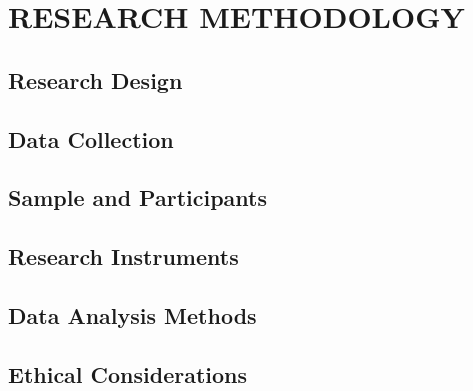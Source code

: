 
\chapter{RESEARCH METHODOLOGY}\label{chap:methodology}


\section{Research Design}\label{sec:design}

\section{Data Collection}\label{sec:data_collection}

\section{Sample and Participants}\label{sec:sample}

\section{Research Instruments}\label{sec:instruments}

\section{Data Analysis Methods}\label{sec:analysis_methods}

\section{Ethical Considerations}\label{sec:ethics}
